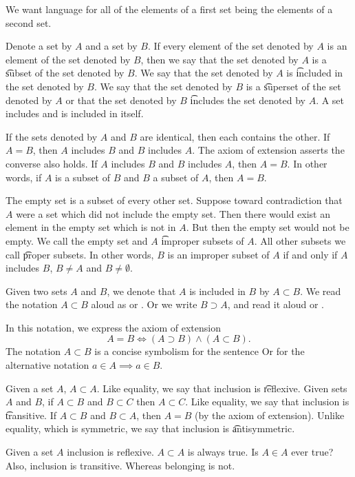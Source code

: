 

We want language for all of the elements of a first set being the elements of a second set.


Denote a set by $A$ and a set by $B$.
If every element of the set denoted by $A$ is an element of the set denoted by $B$, then we say that the set denoted by $A$ is a \t{subset} of the set denoted by $B$.
We say that the set denoted by $A$ is \t{included} in the set denoted by $B$.
We say that the set denoted by $B$ is a \t{superset} of the set denoted by $A$ or that the set denoted by $B$ \t{includes} the set denoted by $A$.
A set includes and is included in itself.

If the sets denoted by $A$ and $B$ are identical, then each contains the other.
If $A = B$, then $A$ includes $B$ and $B$ includes $A$.
The axiom of extension asserts the converse also holds.
If $A$ includes $B$ and $B$ includes $A$, then $A = B$.
In other words, if $A$ is a subset of $B$ and $B$ a subset of $A$, then $A = B$.

The empty set is a subset of every other set.
Suppose toward contradiction that $A$ were a set which did not include the empty set.
Then there would exist an element in the empty set which is not in $A$.
But then the empty set would not be empty.
We call the empty set and $A$ \t{improper subsets} of $A$.
All other subsets we call \t{proper subsets}.
In other words, $B$ is an improper subset of $A$ if and only if $A$ includes $B$, $B \neq A$ and $B \neq \emptyset$.

Given two sets $A$ and $B$, we denote that $A$ is included in $B$ by $A \subset B$.
We read the notation $A \subset B$ aloud as  or .
Or we write $B \supset A$, and read it aloud  or .

In this notation, we express the axiom of extension
\[
  A = B \Leftrightarrow (A \supset B) \land (A \subset B).
\]
The notation $A \subset B$
is a concise symbolism for
the sentence
 Or for the alternative notation
$a \in A \implies a \in B$.


Given a set $A$, $A \subset A$.
Like equality, we say that inclusion is \t{reflexive}.
Given sets $A$ and $B$, if $A \subset B$ and $B \subset C$ then $A \subset C$.
Like equality, we say that inclusion is \t{transitive}.
If $A \subset B$ and $B \subset A$, then $A = B$ (by the axiom of extension).
Unlike equality, which is symmetric, we say that inclusion is \t{antisymmetric}.


Given a set $A$ inclusion is reflexive.
$A \subset A$ is always true.
Is $A \in A$ ever true?
Also, inclusion is transitive.
Whereas belonging is not.
